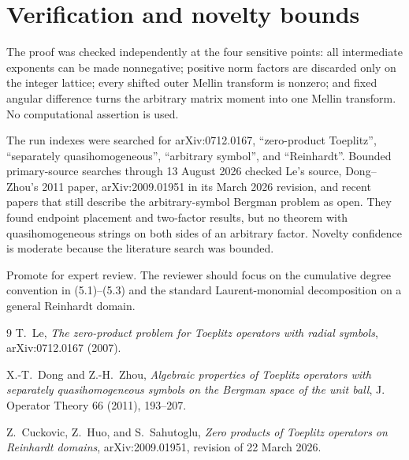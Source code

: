 \documentclass[11pt]{article}
\begin{document}
\section{Verification and novelty bounds}

The proof was checked independently at the four sensitive points: all
intermediate exponents can be made nonnegative; positive norm factors are
discarded only on the integer lattice; every shifted outer Mellin transform
is nonzero; and fixed angular difference turns the arbitrary matrix moment
into one Mellin transform.  No computational assertion is used.

The run indexes were searched for arXiv:0712.0167, ``zero-product Toeplitz'',
``separately quasihomogeneous'', ``arbitrary symbol'', and ``Reinhardt''.
Bounded primary-source searches through 13 August 2026 checked Le's source,
Dong--Zhou's 2011 paper, arXiv:2009.01951 in its March 2026 revision, and
recent papers that still describe the arbitrary-symbol Bergman problem as
open.  They found endpoint placement and two-factor results, but no theorem
with quasihomogeneous strings on both sides of an arbitrary factor.  Novelty
confidence is moderate because the literature search was bounded.

Promote for expert review.  The reviewer should focus on the cumulative
degree convention in (5.1)--(5.3) and the standard Laurent-monomial
decomposition on a general Reinhardt domain.

\begin{thebibliography}{9}
T.~Le,
\emph{The zero-product problem for Toeplitz operators with radial symbols},
arXiv:0712.0167 (2007).

X.-T.~Dong and Z.-H.~Zhou,
\emph{Algebraic properties of Toeplitz operators with separately
quasihomogeneous symbols on the Bergman space of the unit ball},
J. Operator Theory 66 (2011), 193--207.

Z.~Cuckovic, Z.~Huo, and S.~Sahutoglu,
\emph{Zero products of Toeplitz operators on Reinhardt domains},
arXiv:2009.01951, revision of 22 March 2026.
\end{thebibliography}
\end{document}
